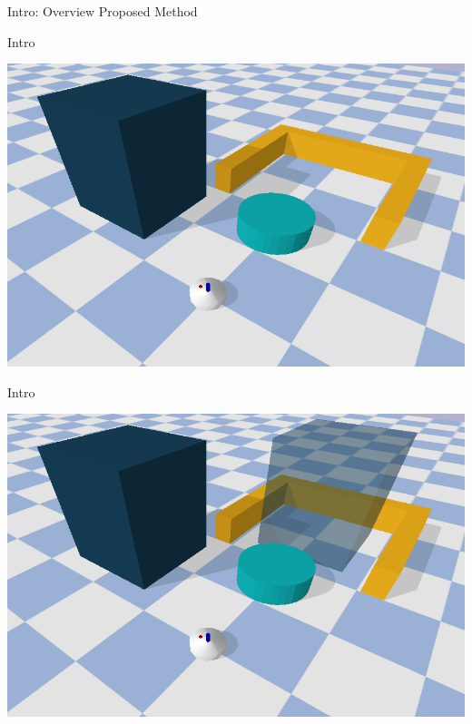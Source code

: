 \begin{frame}[c]{Intro: Overview Proposed Method} 
  
\end{frame}

\begin{frame}[fragile]{Intro}
\begin{center}
\includegraphics[width=1.0\textwidth]{figures/introduction/blockade}
\end{center}
\end{frame}


\begin{frame}[fragile]{Intro}
\begin{center}
\includegraphics[width=1.0\textwidth]{figures/introduction/blockade_with_target}
\end{center}
\end{frame}

